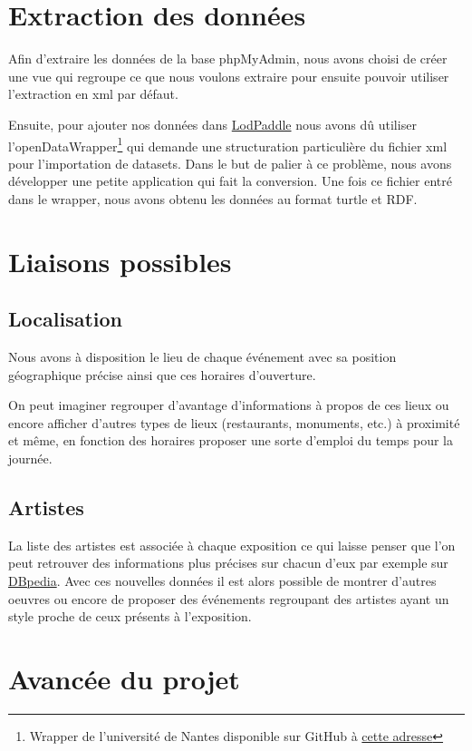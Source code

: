 \documentclass[12pt,a4paper]{article}
\begin{document}
	\section{Extraction des données}	
	Afin d'extraire les données de la base phpMyAdmin, nous avons choisi de créer une vue qui regroupe ce que nous voulons extraire pour ensuite pouvoir utiliser l'extraction en xml par défaut. 
	
	
	Ensuite, pour ajouter nos données dans \href{http://lodpaddle.univ-nantes.fr/lodpaddle}{LodPaddle} nous avons dû utiliser l'openDataWrapper\footnote{Wrapper de l'université de Nantes disponible sur GitHub à \href{http://github.com/masterALMA2016/openDataWrapper}{cette adresse}} qui demande une structuration particulière du fichier xml pour l'importation de datasets. Dans le but de palier à ce problème, nous avons développer une petite application qui fait la conversion. Une fois ce fichier entré dans le wrapper, nous avons obtenu les données au format turtle et RDF.
	
	\section{Liaisons possibles}
	\subsection{Localisation}
	Nous avons à disposition le lieu de chaque événement avec sa position géographique précise ainsi que ces horaires d'ouverture. 
	
On peut imaginer regrouper d'avantage d'informations à propos de ces lieux ou encore afficher d'autres types de lieux (restaurants, monuments, etc.) à proximité et même, en fonction des horaires proposer une sorte d'emploi du temps pour la journée.
	\subsection{Artistes}
	La liste des artistes est associée à chaque exposition ce qui laisse penser que l'on peut retrouver des informations plus précises sur chacun d'eux par exemple sur \href{http://dbpedia.org}{DBpedia}. Avec ces nouvelles données il est alors possible de montrer d'autres oeuvres ou encore de proposer des événements regroupant des artistes ayant un style proche de ceux présents à l'exposition.
	
	\section{Avancée du projet}
\end{document}
